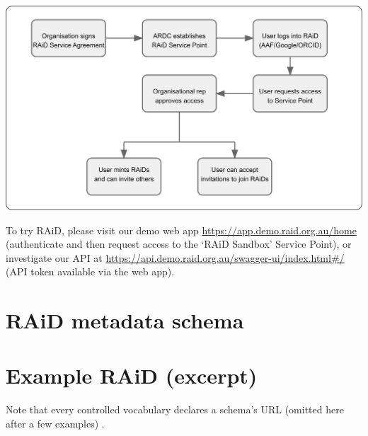 \documentclass[a0,portrait]{a0poster}
\newenvironment{Figure}
  {\par\medskip\noindent\minipage{\linewidth}}
  {\endminipage\par\medskip}
\begin{document}
\begin{multicols}{3}
\begin{Figure}
  \centering
  \includegraphics[width=\linewidth]{figures/raid-workflow.png}
  \label{aws-architecture}
\end{Figure}

\large{To try RAiD, please visit our demo web app \href{https://app.demo.raid.org.au/home}{https://app.demo.raid.org.au/home} (authenticate and then request access to the ‘RAiD Sandbox’ Service Point), or investigate our API at \href{https://api.demo.raid.org.au/swagger-ui/index.html\#/}{https://api.demo.raid.org.au/swagger-ui/index.html\#/} (API token available via the web app).
}

\color{ARDCPink}
\section*{\LARGE RAiD metadata schema}
\color{DarkGrey}
\large{

}

\vspace{6cm}


\color{ARDCYellow}
\section*{\LARGE Example RAiD (excerpt)}
\color{DarkGrey}
\large{
Note that every controlled vocabulary declares a schema's URL (omitted here after a few examples) .
}

\small{

}

\end{multicols}

\vfill

\end{document}
